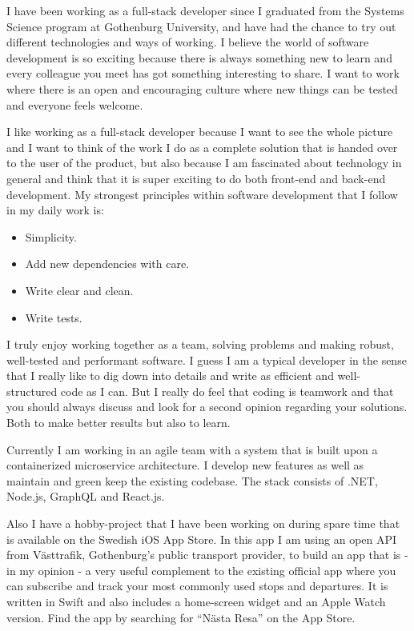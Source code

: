 

I have been working as a full-stack developer since I graduated from the Systems Science program at
Gothenburg University, and have had the chance to try out different technologies and ways
of working. I believe the world of software development is so exciting because there is always something new
to learn and every colleague you meet has got something interesting to share. I want to work where there is an
open and encouraging culture where new things can be tested and everyone feels welcome.

I like working as a full-stack developer because I want to see the whole picture and I want to think of the work
I do as a complete solution that is handed over to the user of the product, but also because I am
fascinated about technology in general and think that it is super exciting to do both front-end and
back-end development. My strongest principles within software development that I follow in my daily work is:

\begin{itemize}
  \item Simplicity.
  \item Add new dependencies with care.
  \item Write clear and clean.
  \item Write tests.
\end{itemize}

I truly enjoy working together as a team, solving problems and making robust, well-tested and
performant software. I guess I am a typical developer in the sense that I really like
to dig down into details and write as efficient and well-structured code as I can. But I really do feel that coding
is teamwork and that you should always discuss and look for a second opinion regarding your solutions.
Both to make better results but also to learn.

Currently I am working in an agile team with a system that is built upon a containerized microservice architecture.
I develop new features as well as maintain and green keep the existing codebase.
The stack consists of .NET, Node.js, GraphQL and React.js.

Also I have a hobby-project that I have been working on during spare time that is available
on the Swedish iOS App Store. In this app I am using an open API from Västtrafik, Gothenburg’s public
transport provider, to build an app that is - in my opinion - a very useful complement to the
existing official app where you can subscribe and track your most commonly used stops and departures.
It is written in Swift and also includes a home-screen widget and an Apple Watch version. Find
the app by searching for “Nästa Resa” on the App Store.

